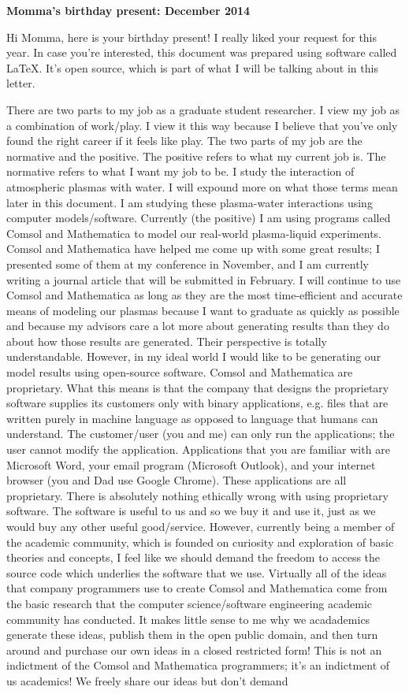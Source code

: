 \documentclass[11pt]{article}
\begin{document}
\onehalfspace
\textbf{Momma's birthday present: December 2014}

Hi Momma, here is your birthday present! I really liked your request for this year. In case you're interested, this document was prepared using software called LaTeX. It's open source, which is part of what I will be talking about in this letter.

There are two parts to my job as a graduate student researcher. I view my job as a combination of work/play. I view it this way because I believe that you've only found the right career if it feels like play. The two parts of my job are the normative and the positive. The positive refers to what my current job is. The normative refers to what I want my job to be. I study the interaction of atmospheric plasmas with water. I will expound more on what those terms mean later in this document. I am studying these plasma-water interactions using computer models/software. Currently (the positive) I am using programs called Comsol and Mathematica to model our real-world plasma-liquid experiments. Comsol and Mathematica have helped me come up with some great results; I presented some of them at my conference in November, and I am currently writing a journal article that will be submitted in February. I will continue to use Comsol and Mathematica as long as they are the most time-efficient and accurate means of modeling our plasmas because I want to graduate as quickly as possible and because my advisors care a lot more about generating results than they do about how those results are generated. Their perspective is totally understandable. However, in my ideal world I would like to be generating our model results using open-source software. Comsol and Mathematica are proprietary. What this means is that the company that designs the proprietary software supplies its customers only with binary applications, e.g. files that are written purely in machine language as opposed to language that humans can understand. The customer/user (you and me) can only run the applications; the user cannot modify the application. Applications that you are familiar with are Microsoft Word, your email program (Microsoft Outlook), and your internet browser (you and Dad use Google Chrome). These applications are all proprietary. There is absolutely nothing ethically wrong with using proprietary software. The software is useful to us and so we buy it and use it, just as we would buy any other useful good/service. However, currently being a member of the academic community, which is founded on curiosity and exploration of basic theories and concepts, I feel like we should demand the freedom to access the source code which underlies the software that we use. Virtually all of the ideas that company programmers use to create Comsol and Mathematica come from the basic research that the computer science/software engineering academic community has conducted. It makes little sense to me why we acadademics generate these ideas, publish them in the open public domain, and then turn around and purchase our own ideas in a closed restricted form! This is not an indictment of the Comsol and Mathematica programmers; it's an indictment of us academics! We freely share our ideas but don't demand 
\end{document}

